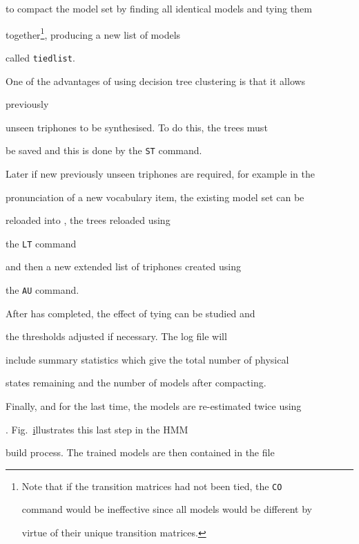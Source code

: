 to compact the model set by finding all identical models and tying them


together\footnote{


Note that if the transition matrices had not been tied, the \texttt{CO}


command would be ineffective since all models would be different by


virtue of their unique transition matrices.}, producing a new list of models


called \texttt{tiedlist}.





One of the advantages of using decision tree clustering is that it allows


previously


unseen triphones to be synthesised.  To do this, the trees must


be saved and this is done by the \texttt{ST} command.


Later if new previously unseen triphones are required, for example in the


pronunciation of a new vocabulary item, the existing model set can be


reloaded into , the trees reloaded using 


the \texttt{LT} command


and then a new extended list of triphones created using 


the \texttt{AU} command.





After  has completed,  the effect of tying can be studied and


the thresholds adjusted if necessary.  The log file will


include summary statistics which give the total number of physical


states remaining and the number of models after compacting.





Finally, and for the last time, the models are re-estimated twice using


.  Fig.~\href{f:step10} illustrates this last step in the HMM


build process.  The trained models are then contained in the file


